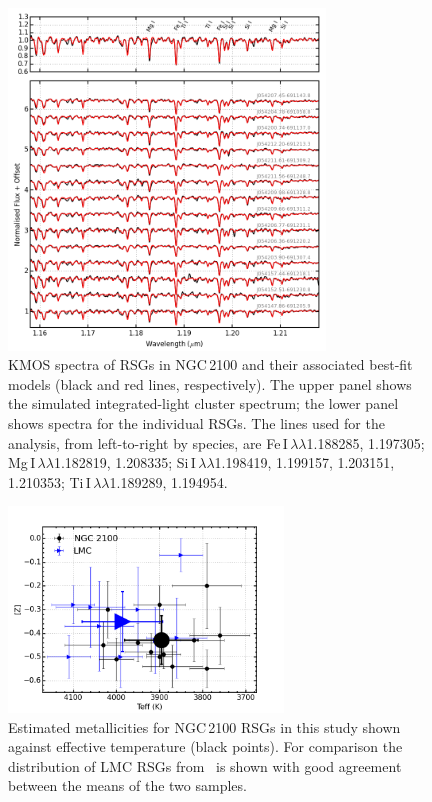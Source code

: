 \begin{figure}
 \begin{center}
 \centering
\includegraphics[width=0.75\textwidth]{ngc2100/NGC2100-model-fits}
\caption{KMOS spectra of RSGs in NGC\,2100 and their associated best-fit models
(black and red lines, respectively).
The upper panel shows the simulated integrated-light cluster spectrum;
the lower panel shows spectra for the individual RSGs.
The lines used for the analysis, from left-to-right by species, are
Fe\,{\scriptsize I}$\,\lambda\lambda$1.188285,
1.197305;
Mg\,{\scriptsize I}$\,\lambda\lambda$1.182819,
1.208335;
Si\,{\scriptsize I}$\,\lambda\lambda$1.198419,
1.199157,
1.203151,
1.210353;
Ti\,{\scriptsize I}$\,\lambda\lambda$1.189289,
1.194954.\label{fig:model_fits}}
\end{center}
\end{figure}

\begin{figure}
\centering
 \includegraphics[width=0.65\textwidth]{ngc2100/NGC2100-TeffvsZ-2100-LMC}
 \caption{Estimated metallicities for NGC\,2100 RSGs in this study shown against effective temperature (black points).
        For comparison the distribution of LMC RSGs from~\citet[][blue triangles]{2015ApJ...806...21D} is shown with good agreement between the means of the two samples.
\label{fig:TeffvsZ}
          }
\end{figure}

